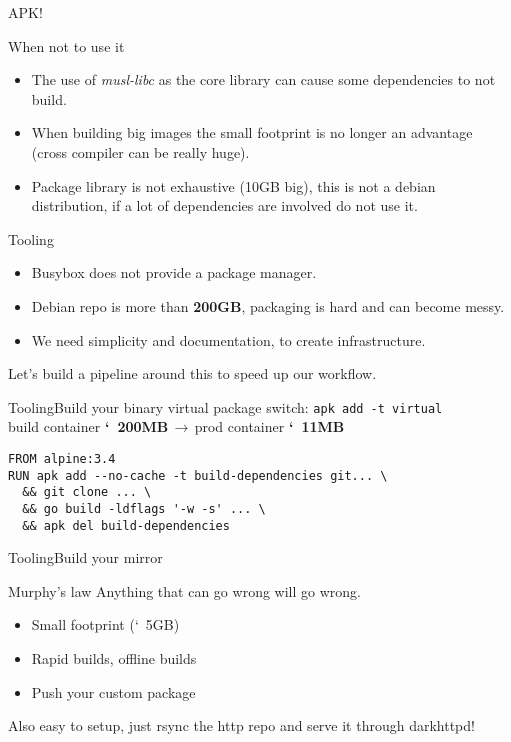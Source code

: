 \documentclass{beamer}
\begin{document}
\begin{frame}
    \LARGE APK!
\end{frame}

\begin{frame}{When not to use it}
  \begin{itemize}
    \item The use of \textit{musl-libc} as the core library can cause some
      dependencies to not build.
    \item When building big images the small footprint is no longer an advantage
      (cross compiler can be really huge).
    \item Package library is not exhaustive (10GB big),
      this is not a debian distribution,
      if a lot of dependencies are involved do not use it.
  \end{itemize}
\end{frame}

\begin{frame}{Tooling}{}
  \begin{itemize}
    \item Busybox does not provide a package manager.
    \item Debian repo is more than \textbf{200GB}, packaging is hard and can become messy.
    \item We need simplicity and documentation, to create infrastructure.
  \end{itemize}
  Let's build a pipeline around this to speed up our workflow.
\end{frame}


\begin{frame}[fragile]{Tooling}{Build your binary}
  virtual package switch:  \texttt{apk add -t virtual} \\
  build container \textbf{\char`~200MB}$\,\to\,$prod container
  \textbf{\char`~11MB}

  \begin{verbatim}
FROM alpine:3.4
RUN apk add --no-cache -t build-dependencies git... \
  && git clone ... \
  && go build -ldflags '-w -s' ... \
  && apk del build-dependencies
  \end{verbatim}
\end{frame}

\begin{frame}[fragile]{Tooling}{Build your mirror}

  \begin{block}{Murphy's law}
    Anything that can go wrong will go wrong.
  \end{block}

    \begin{itemize}
      \item Small footprint (\char`~5GB)
      \item Rapid builds, offline builds
      \item Push your custom package
  \end{itemize}

  Also easy to setup, just rsync the http repo and serve it through darkhttpd!
\end{frame}
\end{document}
